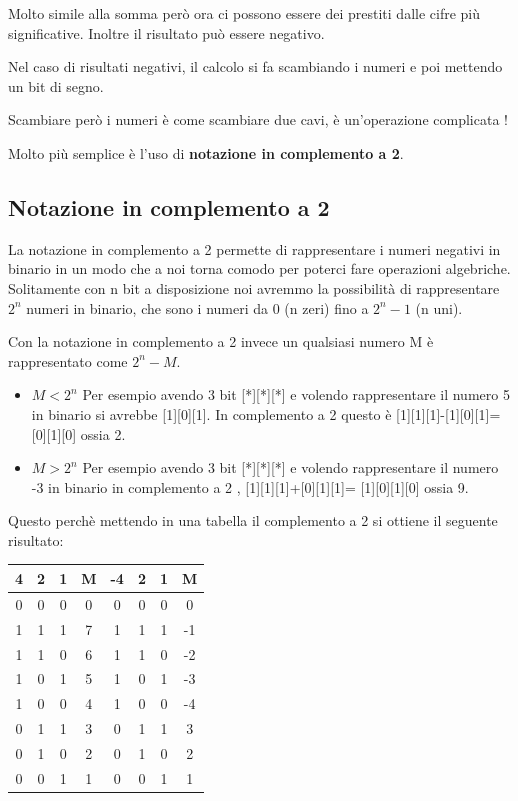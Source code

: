 \documentclass[a4paper]{book}
\begin{document}
Molto simile alla somma però ora ci possono essere dei prestiti dalle cifre più significative.
Inoltre il risultato può essere negativo.


Nel caso di risultati negativi, il calcolo si fa scambiando i numeri e poi mettendo un bit di segno.

Scambiare però i numeri è come scambiare due cavi, è un'operazione complicata !

Molto più semplice è l'uso di \textbf{notazione in complemento a 2}. 

\subsection{Notazione in complemento a 2}

La notazione in complemento a 2 permette di rappresentare i numeri negativi in binario in un modo che a noi torna comodo per poterci fare operazioni algebriche.\\
Solitamente con n bit a disposizione noi avremmo la possibilità di rappresentare \(2^n\) numeri in binario, che sono i numeri da 0 (n zeri) fino a \(2^n-1\) (n uni).

Con la notazione in complemento a 2 invece un qualsiasi numero M è rappresentato come \(2^n-M\).

\begin{itemize}
\item{\(M<2^n\)}
Per esempio avendo 3 bit [*][*][*] e volendo rappresentare il numero 5 in binario si avrebbe [1][0][1].
In complemento a 2 questo è [1][1][1]-[1][0][1]=[0][1][0] ossia 2.
\item{\(M>2^n\)}
Per esempio avendo 3 bit [*][*][*] e volendo rappresentare il numero -3 in binario in complemento a 2 , [1][1][1]+[0][1][1]= [1][0][1][0] ossia 9.

\end{itemize}

Questo perchè mettendo in una tabella il complemento a 2 si ottiene il seguente risultato:

\begin{tabular}{|c|c|c|c||c|c|c|c|}
\hline
4 & 2 & 1 & M & -4 & 2 & 1 & M  \\
\hline
0 & 0 & 0 & 0 &  0 & 0 & 0 & 0  \\
\hline
1 & 1 & 1 & 7 &  1 & 1 & 1 & -1 \\
\hline
1 & 1 & 0 & 6 &  1 & 1 & 0 & -2 \\
\hline
1 & 0 & 1 & 5 &  1 & 0 & 1 & -3 \\
\hline
1 & 0 & 0 & 4 &  1 & 0 & 0 & -4 \\
\hline
0 & 1 & 1 & 3 &  0 & 1 & 1 & 3  \\
\hline
0 & 1 & 0 & 2 &  0 & 1 & 0 & 2  \\
\hline
0 & 0 & 1 & 1 &  0 & 0 & 1 & 1  \\
\hline
\end{tabular}
\end{document}
